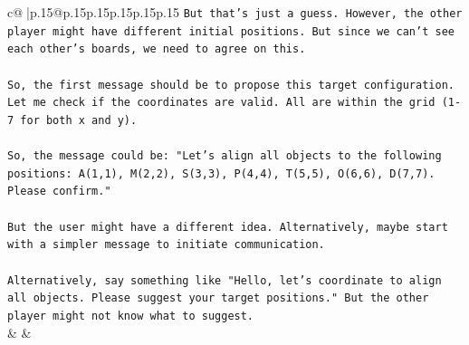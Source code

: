 \documentclass{article}
\begin{document}
{\begin{supertabular}{c@{$\;$}|p{.15\linewidth}@{}p{.15\linewidth}p{.15\linewidth}p{.15\linewidth}p{.15\linewidth}p{.15\linewidth}}
{{{\texttt{But that's just a guess. However, the other player might have different initial positions. But since we can't see each other's boards, we need to agree on this.} \\
\\ 
\texttt{So, the first message should be to propose this target configuration. Let me check if the coordinates are valid. All are within the grid (1{-}7 for both x and y).} \\
\\ 
\texttt{So, the message could be: "Let's align all objects to the following positions: A(1,1), M(2,2), S(3,3), P(4,4), T(5,5), O(6,6), D(7,7). Please confirm."} \\
\\ 
\texttt{But the user might have a different idea. Alternatively, maybe start with a simpler message to initiate communication.} \\
\\ 
\texttt{Alternatively, say something like "Hello, let's coordinate to align all objects. Please suggest your target positions." But the other player might not know what to suggest.} \\
            }
        }
    }
    & & \\ \\


\end{supertabular}}
\end{document}
